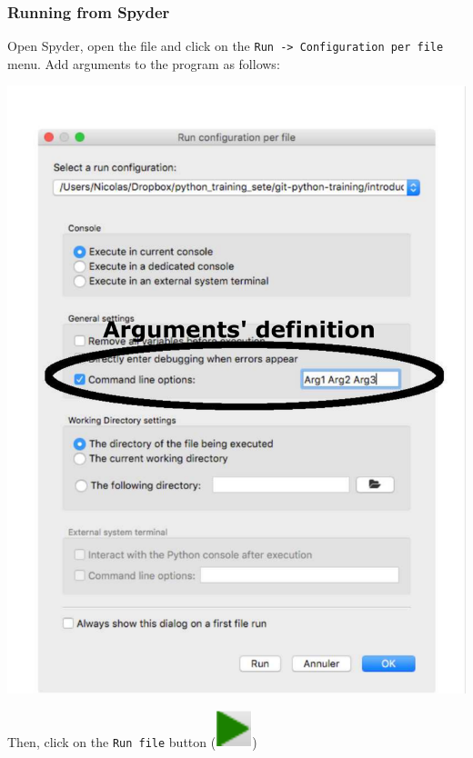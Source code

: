 \begin{frame}[fragile]
    \frametitle{Running from Spyder}
    Open Spyder, open the file and click on the \scriptsize \verb+Run -> Configuration per file+ \normalsize menu. Add arguments to the program as follows:\\
    \vspace{-0.5em}
    \begin{center}
    \includegraphics[scale=0.35, trim={0cm 0cm 0cm 0cm}, clip=true]{figs/args_spyder.pdf}
    \end{center}
    Then, click on the \verb+Run file+ button (\includegraphics[scale=0.5]{figs/run_file.pdf})
\end{frame}
